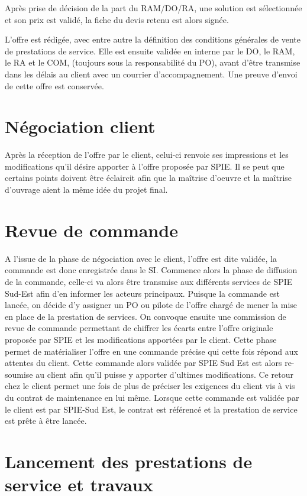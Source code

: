 Après prise de décision de la part du RAM/DO/RA, une solution est sélectionnée et son prix est validé, la fiche du devis retenu est alors signée.

L’offre est rédigée, avec entre autre la définition des conditions générales de vente de prestations de service. Elle est ensuite validée en interne par le DO, le RAM, le RA et le COM, (toujours sous la responsabilité du PO), avant d’être transmise dans les délais au client avec un courrier d’accompagnement. Une preuve d’envoi de cette offre est conservée.

\section{Négociation client}

Après la réception de l’offre par le client, celui-ci renvoie ses impressions et les modifications qu’il désire apporter à l’offre proposée par SPIE. Il se peut que certains points doivent être éclaircit afin que la maîtrise d’oeuvre et la maîtrise d’ouvrage aient la même idée du projet final.

\section{Revue de commande}

A l’issue de la phase de négociation avec le client, l’offre est dite validée, la commande est donc enregistrée dans le SI. Commence alors la phase de diffusion de la commande, celle-ci va alors être transmise aux différents services de SPIE Sud-Est afin d’en informer les acteurs principaux. Puisque la commande est lancée, on décide d’y assigner un PO ou pilote de l’offre chargé de mener la mise en place de la prestation de services. On convoque ensuite une commission de revue de commande permettant de chiffrer les écarts entre l’offre originale proposée par SPIE et les modifications apportées par le client. Cette phase permet de matérialiser l’offre en une commande précise qui cette fois répond aux attentes du client. Cette commande alors validée par SPIE Sud Est est alors re-soumise au client afin qu’il puisse y apporter d’ultimes modifications. Ce retour chez le client permet une fois de plus de préciser les exigences du client vis à vis du contrat de maintenance en lui même. Lorsque cette commande est validée par le client est par SPIE-Sud Est, le contrat est référencé et la prestation de service est prête à être lancée.

\section{Lancement des prestations de service et travaux}

